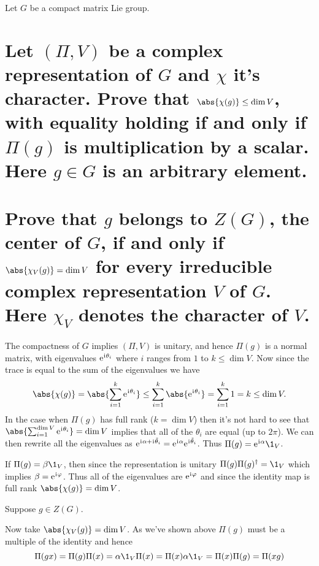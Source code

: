 \documentclass[
	pages,
	boxes,
	color=WildStrawberry
]{homework}
\begin{document}
\begin{problem}
Let $G$ be a compact matrix Lie group.
\begin{parts}
	\part{Let $(\Pi, V)$ be a complex representation of $G$ and $\chi$ it's character. Prove that $\abs{\chi(g)} \leq \dim V$, with equality holding if and only if $\Pi(g)$ is multiplication by a scalar. Here $g\in G$ is an arbitrary element.}\label{part:6a}
	\part{Prove that $g$ belongs to $Z(G)$, the center of $G$, if and only if $\abs{\chi_V(g)} = \dim V$ for every irreducible complex representation $V$ of $G$. Here $\chi_V$ denotes the character of $V$.}\label{part:6b}
\end{parts}
\end{problem}

\begin{solution}
	\ref{part:6a}
	The compactness of $G$ implies $(\Pi, V)$ is unitary, and hence $\Pi(g)$ is a normal matrix, with eigenvalues $\mathrm{e}^{\mkern1mu\mathrm{i}\mkern1mu\theta_i}$ where $i$ ranges from $1$ to $k \leq \dim V$. Now since the trace is equal to the sum of the eigenvalues we have
	\begin{equation*}
		\abs{\chi(g)} = \abs{\sum_{i=1}^k\e^{\iu\theta_i}} \leq \sum_{i=1}^k \abs{\e^{\iu \theta_i}} = \sum_{i=1}^k 1 = k \leq \dim V.
	\end{equation*}
	In the case when $\Pi(g)$ has full rank ($k = \dim V$) then it's not hard to see that $\abs{\sum_{i = 1}^{\dim V}\e^{\iu \theta_i}} = \dim V$ implies that all of the $\theta_i$ are equal (up to $2\pi$). We can then rewrite all the eigenvalues as $\mathrm{e}^{\mkern1mu\mathrm{i}\mkern1mu\alpha + \mkern1mu\mathrm{i}\mkern1mu\tilde{\theta}_i} = \mathrm{e}^{\mkern1mu\mathrm{i}\mkern1mu\alpha}\mathrm{e}^{\mkern1mu\mathrm{i}\mkern1mu\tilde{\theta}_i}$. Thus $\Pi(g) = \e^{\iu\alpha}\1_V$.

	If $\Pi(g) = \beta\1_V$, then since the representation is unitary $\Pi(g)\Pi(g)^\dagger = \1_V$ which implies $\beta = \mathrm{e}^{\mkern1mu\mathrm{i}\mkern1mu\varphi}$. Thus all of the eigenvalues are $\mathrm{e}^{\mkern1mu\mathrm{i}\mkern1mu\varphi}$ and since the identity map is full rank $\abs{\chi(g)} = \dim V$.

	\ref{part:6b}
	Suppose $g\in Z(G)$.

	Now take $\abs{\chi_V(g)} = \dim V$. As we've shown above $\Pi(g)$ must be a multiple of the identity and hence
	\begin{equation*}
		\Pi(gx) = \Pi(g)\Pi(x) = \alpha\1_V\Pi(x) = \Pi(x)\alpha\1_V = \Pi(x)\Pi(g) = \Pi(xg)
	\end{equation*}
\end{solution}
\end{document}
